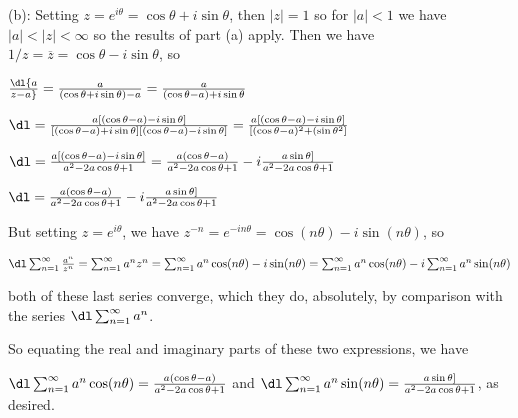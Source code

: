 \msk

\item{(b):} Setting $z=e^{i\theta}=\cos\theta+i\sin\theta$, then $|z|=1$ so for $|a|<1$
we have $|a|<|z|<\infty$ so the results of part (a) apply. Then we have
$1/z=\overline{z}=\cos\theta-i\sin\theta$, so

\ssk

\item{}
$\dl {{a}\over{z-a}}={{a}\over{(\cos\theta+i\sin\theta)-a}}=
{{a}\over{(\cos\theta-a)+i\sin\theta}}$

\ssk

$\dl ={{a[(\cos\theta-a)-i\sin\theta]}\over{[(\cos\theta-a)+i\sin\theta][(\cos\theta-a)-i\sin\theta]}}
={{a[(\cos\theta-a)-i\sin\theta]}\over{[(\cos\theta-a)^2+(\sin\theta^2]}}$

\ssk

$\dl ={{a[(\cos\theta-a)-i\sin\theta]}\over{a^2-2a\cos\theta+1}}
={{a(\cos\theta-a)}\over{a^2-2a\cos\theta+1}}-i{{a\sin\theta]}\over{a^2-2a\cos\theta+1}}$

\ssk

$\dl ={{a(\cos\theta-a)}\over{a^2-2a\cos\theta+1}}-i{{a\sin\theta]}\over{a^2-2a\cos\theta+1}}$

\ssk

\item{} But setting $z=e^{i\theta}$, we have $z^{-n}=e^{-in\theta}=\cos(n\theta)-i\sin(n\theta)$, so 

\ssk

$\dl\sum_{n=1}^\infty {{a^n}\over{z^n}} = \sum_{n=1}^\infty a^nz^n = 
\sum_{n=1}^\infty a^n\cos(n\theta)-i\sin(n\theta) = 
\sum_{n=1}^\infty a^n\cos(n\theta)-i\sum_{n=1}^\infty a^n\sin(n\theta)$ 

\ssk

\item{}  both of these last series converge, which they do, absolutely, by comparison with
the series $\dl\sum_{n=1}^\infty a^n$.

\ssk

\item{} So equating the real and imaginary parts of these two expressions, we have

\ssk

\item{} $\dl\sum_{n=1}^\infty a^n\cos(n\theta) = {{a(\cos\theta-a)}\over{a^2-2a\cos\theta+1}}$ and
$\dl\sum_{n=1}^\infty a^n\sin(n\theta) = {{a\sin\theta]}\over{a^2-2a\cos\theta+1}}$, as desired.


\bsk



